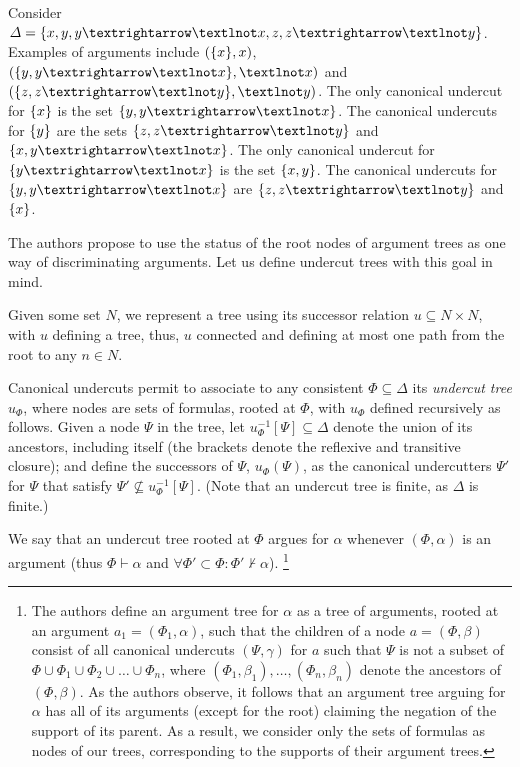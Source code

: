 \documentclass[version=3.21, pagesize, twoside=off, bibliography=totoc, DIV=calc, fontsize=12pt, a4paper, french, english]{scrartcl}
\begin{document}
\begin{example}
	\label{ex:abstract}
	Consider $\Delta = \set{x, y, y → ¬x, z, z → ¬y}$. Examples of arguments include $(\{x\}, x)$, $(\set{y, y → ¬x}, ¬x)$ and $(\set{z, z → ¬y}, ¬y)$. 
	The only canonical undercut for $\{x\}$ is the set $\set{y, y → ¬x}$. 
	The canonical undercuts for $\{y\}$ are the sets $\set{z, z → ¬y}$ and $\set{x, y → ¬x}$. 
	The only canonical undercut for $\set{y → ¬x}$ is the set $\{x, y\}$. 
	The canonical undercuts for $\set{y, y → ¬x}$ are $\set{z, z → ¬y}$ and $\{x\}$.
\end{example}

The authors propose to use the status of the root nodes of argument trees as one way of discriminating arguments. Let us define undercut trees with this goal in mind.

Given some set $N$, we represent a tree using its successor relation $u \subseteq N × N$, with $u$ defining a tree, thus, $u$ connected and defining at most one path from the root to any $n \in N$. 

Canonical undercuts permit to associate to any consistent $\Phi \subseteq \Delta$ its \emph{undercut tree} $u_\Phi$, where nodes are sets of formulas, rooted at $\Phi$, with $u_\Phi$ defined recursively as follows. 
Given a node $\Psi$ in the tree, let $u_\Phi^{-1}[\Psi] \subseteq \Delta$ denote the union of its ancestors, including itself (the brackets denote the reflexive and transitive closure); and define the successors of $\Psi$, $u_\Phi(\Psi)$, as the canonical undercutters $\Psi'$ for $\Psi$ that satisfy $\Psi' \nsubseteq u_\Phi^{-1}[\Psi]$.
(Note that an undercut tree is finite, as $\Delta$ is finite.)

We say that an undercut tree rooted at $\Phi$ argues for $\alpha$ whenever $(\Phi, \alpha)$ is an argument (thus $\Phi ⊢ \alpha$ and $\forall \Phi' \subset \Phi: \Phi' ⊬ \alpha$).
\footnote{The authors define an argument tree for $\alpha$ as a tree of arguments, rooted at an argument $a_1 = (\Phi_1, \alpha)$, such that the children of a node $a = (\Phi, \beta)$ consist of all canonical undercuts $(\Psi, \gamma)$ for $a$ such that $\Psi$ is not a subset of $\Phi \cup \Phi_1 \cup \Phi_2 \cup … \cup \Phi_n$, where $(Φ_1, \beta_1), …, (Φ_n, \beta_n)$ denote the ancestors of $(\Phi, \beta)$.
As the authors observe, it follows that an argument tree arguing for $\alpha$ has all of its arguments (except for the root) claiming the negation of the support of its parent. As a result, we consider only the sets of formulas as nodes of our trees, corresponding to the supports of their argument trees.
}
\end{document}
